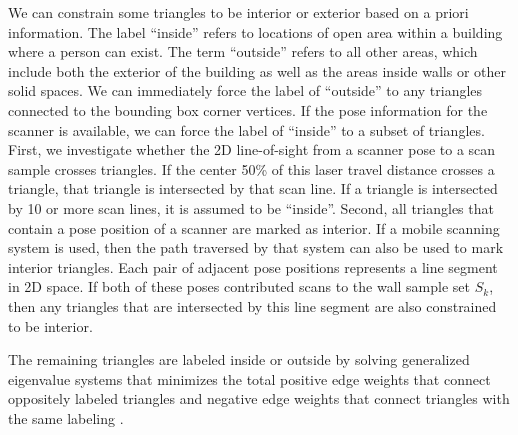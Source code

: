 \documentclass[10pt,twocolumn,letterpaper]{article}
\begin{document}



We can constrain some triangles to be interior or exterior based on a priori information.  The label ``inside'' refers to locations of open area within a building where a person can exist.  The term ``outside'' refers to all other areas, which include both the exterior of the building as well as the areas inside walls or other solid spaces.  We can immediately force the label of ``outside'' to any triangles connected to the bounding box corner vertices.  If the pose information for the scanner is available, we can force the label of ``inside'' to a subset of triangles.  First, we investigate whether the 2D line-of-sight from a scanner pose to a scan sample crosses triangles.  If the center 50\% of this laser travel distance crosses a triangle, that triangle is intersected by that scan line.  If a triangle is intersected by 10 or more scan lines, it is assumed to be ``inside''.  Second, all triangles that contain a pose position of a scanner are marked as interior.  If a mobile scanning system is used, then the path traversed by that system can also be used to mark interior triangles.  Each pair of adjacent pose positions represents a line segment in 2D space.  If both of these poses contributed scans to the wall sample set $S_k$, then any triangles that are intersected by this line segment are also constrained to be interior.

The remaining triangles are labeled inside or outside by solving generalized eigenvalue systems that minimizes the total positive edge weights that connect oppositely labeled triangles and negative edge weights that connect triangles with the same labeling \cite{Eigencrust}.

\end{document}
